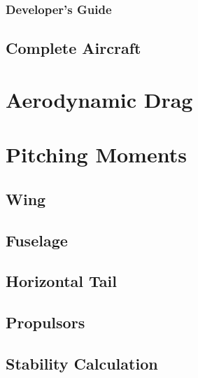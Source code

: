 \subsubsection{Developer's Guide} %




\subsection{Complete Aircraft}

\section{Aerodynamic Drag}

\section{Pitching Moments}
\subsection{Wing}
\subsection{Fuselage}
\subsection{Horizontal Tail}
\subsection{Propulsors}

\subsection{Stability Calculation}
